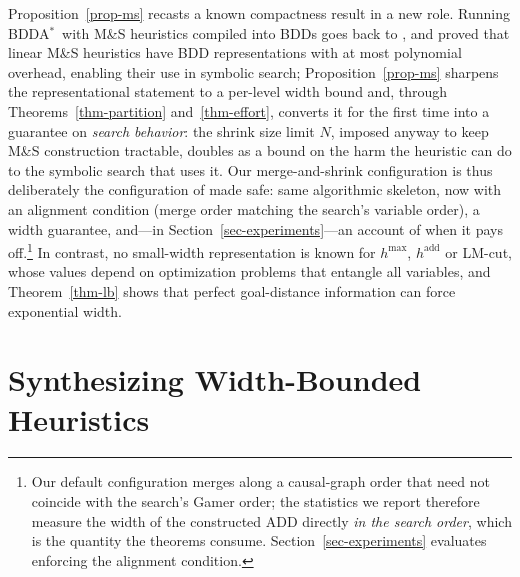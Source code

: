 \documentclass[letterpaper]{article}
\newcommand{\bddastar}{BDDA\ensuremath{^{*}}}
\theoremstyle{plain}
\theoremstyle{definition}
\theoremstyle{remark}
\begin{document}
Proposition~\ref{prop-ms} recasts a known compactness result in a new
role. Running \bddastar\ with M\&S heuristics compiled into BDDs goes
back to \citet{edelkamp-et-al-ecai2012}, and \citet{torralba-phd2015}
proved that linear M\&S heuristics have
BDD representations with at most polynomial overhead, enabling their
use in symbolic search; Proposition~\ref{prop-ms} sharpens the
representational statement to a per-level width bound and, through
Theorems~\ref{thm-partition} and~\ref{thm-effort}, converts it for the
first time into a guarantee on \emph{search behavior}: the shrink size
limit $N$, imposed anyway to keep M\&S construction tractable, doubles
as a bound on the harm the heuristic can do to the symbolic search that
uses it. Our merge-and-shrink configuration is thus deliberately the
configuration of \citet{edelkamp-et-al-ecai2012} made safe: same
algorithmic skeleton, now with an alignment condition (merge order
matching the search's variable order), a width guarantee, and---in
Section~\ref{sec-experiments}---an account of when it pays
off.\footnote{Our default configuration merges along a causal-graph
order that need not coincide with the search's Gamer order; the
statistics we report therefore measure the width of the constructed ADD
directly \emph{in the search order}, which is the quantity the theorems
consume. Section~\ref{sec-experiments} evaluates enforcing the
alignment condition.} In contrast, no small-width representation is known for
$h^{\max}$, $h^{\mathrm{add}}$ or LM-cut, whose values depend on
optimization problems that entangle all variables, and
Theorem~\ref{thm-lb} shows that perfect goal-distance information can
force exponential width.

\section{Synthesizing Width-Bounded Heuristics}
\label{sec-synthesis}
\end{document}
